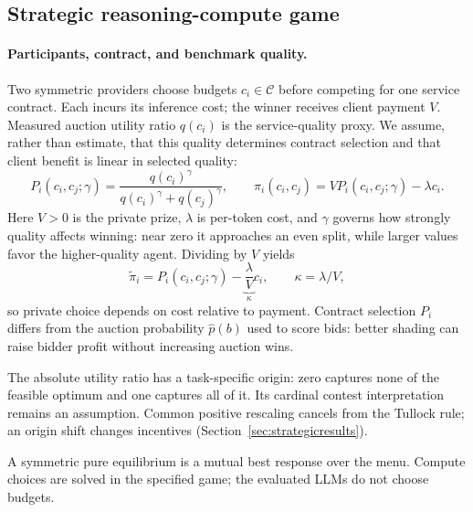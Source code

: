 \documentclass{article}
\begin{document}
\subsection{Strategic reasoning-compute game}

\paragraph{Participants, contract, and benchmark quality.}
Two symmetric providers choose budgets $c_i\in\mathcal C$ before competing for one service contract. Each incurs its inference cost; the winner receives client payment $V$. Measured auction utility ratio $q(c_i)$ is the service-quality proxy. We assume, rather than estimate, that this quality determines contract selection and that client benefit is linear in selected quality:
\begin{equation}
 P_i(c_i,c_j;\gamma)=\frac{q(c_i)^\gamma}{q(c_i)^\gamma+q(c_j)^\gamma},\qquad
 \pi_i(c_i,c_j)=V P_i(c_i,c_j;\gamma)-\lambda c_i.
 \label{eq:contest}
\end{equation}
Here $V>0$ is the private prize, $\lambda$ is per-token cost, and $\gamma$ governs how strongly quality affects winning: near zero it approaches an even split, while larger values favor the higher-quality agent. Dividing by $V$ yields
\begin{equation}
 \widetilde\pi_i=P_i(c_i,c_j;\gamma)-\underbrace{\frac{\lambda}{V}}_{\kappa}c_i,
 \qquad \boxed{\kappa=\lambda/V},
 \label{eq:normalizedprivate}
\end{equation}
so private choice depends on cost relative to payment. Contract selection $P_i$ differs from the auction probability $\widehat p(b)$ used to score bids: better shading can raise bidder profit without increasing auction wins.

The absolute utility ratio has a task-specific origin: zero captures none of the feasible optimum and one captures all of it. Its cardinal contest interpretation remains an assumption. Common positive rescaling cancels from the Tullock rule; an origin shift changes incentives (Section~\ref{sec:strategicresults}).

A symmetric pure equilibrium is a mutual best response over the menu. Compute choices are solved in the specified game; the evaluated LLMs do not choose budgets.
\end{document}
